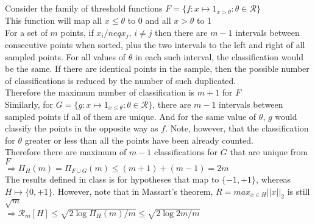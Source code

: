 \documentclass[11pt, oneside]{article}   	%
\begin{document}
\subsection{}
Consider the family of threshold functions $F=\{f:x\mapsto1_{x>\theta}:\theta\in\mathcal{R}\}$\\
\indent This function will map all $x\leq\theta$ to 0 and all $x>\theta$ to 1\\
\indent For a set of $m$ points, if $x_i/neq x_j$, $i\neq j$ then there are $m-1$ intervals between consecutive points when sorted, plus the two intervals to the left and right of all sampled points. For all values of $\theta$ in each such interval, the classification would be the same. If there are identical points in the sample, then the possible number of classifications is reduced by the number of such duplicated. \\
\indent Therefore the maximum number of classification is $m+1$ for $F$\\
\indent Similarly, for $G=\{g:x\mapsto 1_{x\leq \theta} : \theta\in\mathcal{R}\}$, there are $m-1$ intervals between sampled points if all of them are unique. And for the same value of $\theta$, $g$ would classify the points in the opposite way as $f$. Note, however, that the classification for $\theta$ greater or less than all the points have been already counted.\\
\indent Therefore there are maximum of $m-1$ classifications for $G$ that are unique from $F$\\
\indent $\Rightarrow \Pi_H(m)=\Pi_{F\cup G}(m)\leq (m+1) + (m-1) = 2m$\\
\indent The results defined in class is for hypotheses that map to $\{-1,+1\}$, whereas $H\mapsto\{0,+1\}$. However, note that in Massart's theorem, $R=max_{x\in H} ||x||_2$ is still $\sqrt{m}$\\
\indent $\Rightarrow \mathcal{R}_m[H]\leq \sqrt{{2\log\Pi_H(m)}/m}\leq \sqrt{{2\log{2m}}/m}$\\
\subsection{}
\end{document}
